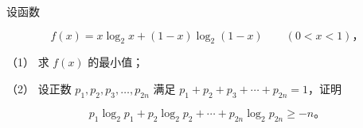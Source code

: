 \begin{question}
设函数

\nopagebreak[4]
\[
f(x)=x\log_2x+(1-x)\log_2(1-x)\qquad(0<x<1)\text{，}
\]

（1） 求 $f(x)$ 的最小值；

（2） 设正数 $p_1,p_2,p_3,\ldots,p_{2n}$ 满足 $p_1+p_2+p_3+\cdots+p_{2n}=1$，证明

\nopagebreak[4]
\[
p_1\log_2p_1+p_2\log_2p_2+\cdots+p_{2n}\log_2p_{2n}\geqslant-n\text{。}
\]

\end{question}